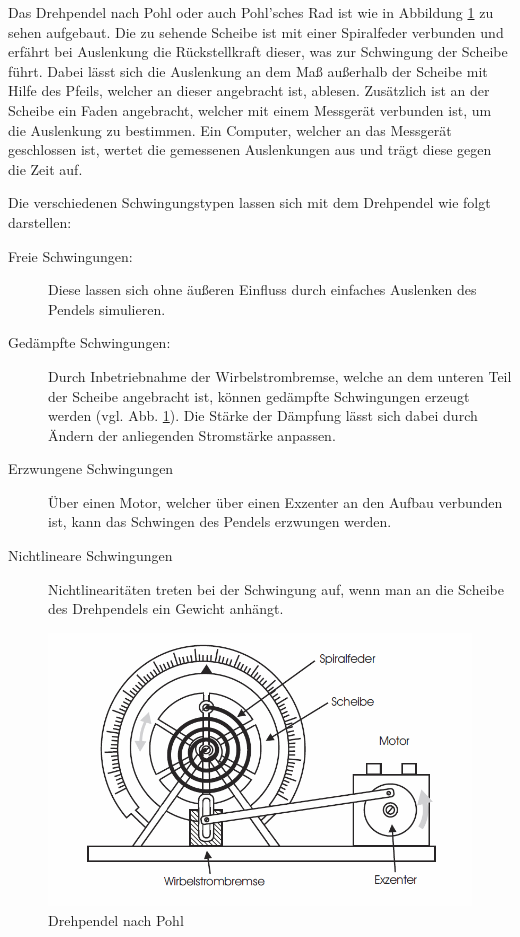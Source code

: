 \documentclass[11pt,a4paper,titlepage, ngerman]{article}
\newcommand{\refabb}[1]{Abb. \ref{abb:#1}}
\begin{document}
		Das Drehpendel nach Pohl oder auch Pohl'sches Rad ist wie in Abbildung \ref{abb:Drehpendel} zu sehen aufgebaut.
		Die zu sehende Scheibe ist mit einer Spiralfeder verbunden und erfährt bei Auslenkung die Rückstellkraft dieser, was zur Schwingung der Scheibe führt.
		Dabei lässt sich die Auslenkung an dem Maß außerhalb der Scheibe mit Hilfe des Pfeils, welcher an dieser angebracht ist, ablesen. 
		Zusätzlich ist an der Scheibe ein Faden angebracht, welcher mit einem Messgerät verbunden ist, um die Auslenkung zu bestimmen. Ein Computer, welcher an das Messgerät geschlossen ist, wertet die gemessenen Auslenkungen aus und trägt diese gegen die Zeit auf. 
		
		Die verschiedenen Schwingungstypen lassen sich mit dem Drehpendel wie folgt darstellen:
		\begin{description}
			\item[Freie Schwingungen:] 
				Diese lassen sich ohne äußeren Einfluss durch einfaches Auslenken des Pendels simulieren.
			\item[Gedämpfte Schwingungen:]
				 Durch Inbetriebnahme der Wirbelstrombremse, welche an dem unteren Teil der Scheibe angebracht ist, können gedämpfte Schwingungen erzeugt werden (vgl. \refabb{Drehpendel}). Die Stärke der Dämpfung lässt sich dabei durch Ändern der anliegenden Stromstärke anpassen. 
			\item[Erzwungene Schwingungen]
				Über einen Motor, welcher über einen Exzenter an den Aufbau verbunden ist, kann das Schwingen des Pendels erzwungen werden. 
			\item[Nichtlineare Schwingungen]
				Nichtlinearitäten treten bei der Schwingung auf, wenn man an die Scheibe des Drehpendels ein Gewicht anhängt.
		\end{description}
		\begin{figure}[ht]
			\includegraphics[width=\textwidth]{Drehpendel.png}
			\caption{Drehpendel nach Pohl}
			\label{abb:Drehpendel}
		\end{figure}
		
\end{document}
